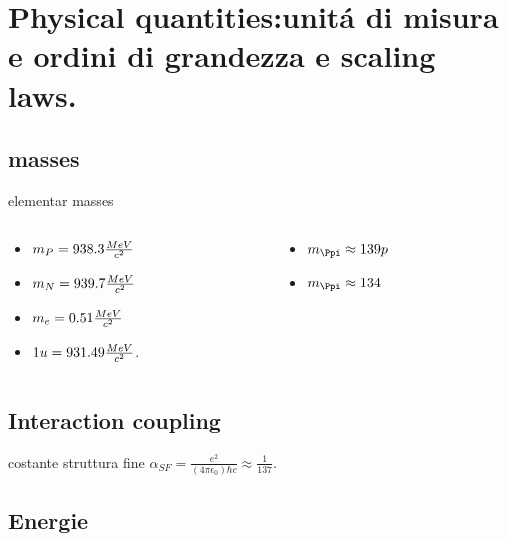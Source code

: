 \section{Physical quantities:unit\'a di misura e ordini di grandezza e scaling laws.}

\subsection{masses}

\begin{frame}{elementar masses}
\begin{columns}[T]
\begin{column}{0.5\textwidth}
\begin{itemize}
\item $m_P=938.3\frac{MeV}{c^2}$
\item $m_N=939.7\frac{MeV}{c^2}$
\item $m_e=0.51\frac{MeV}{c^2}$
\item  $1 u=931.49 \frac{MeV}{c^2}$.
\end{itemize}
\end{column}
\begin{column}{0.5\textwidth}
\begin{itemize}
    \item $m_{\Ppi}\approx139p$
    \item $m_{\Ppi}\approx134$
\end{itemize}
\end{column}
\end{columns}
\end{frame}

\subsection{Interaction coupling}

\begin{frame}{costante struttura fine}
    $\alpha_{SF}=\frac{e^2}{(4\pi\epsilon_0)\hbar c}\approx\frac{1}{137}$.
\end{frame}

\subsection{Energie}

